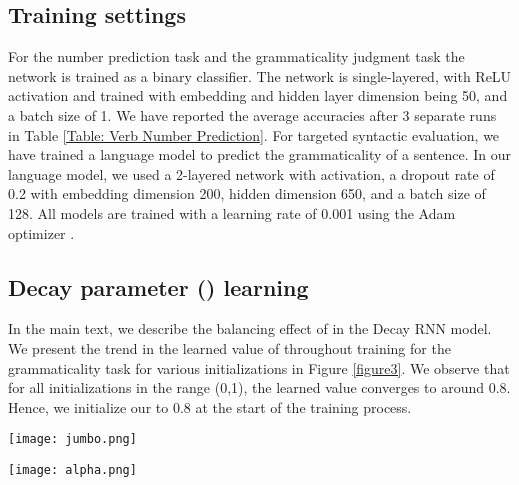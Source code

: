 \documentclass[11pt,a4paper]{article}
\begin{document}
\subsection{Training settings}
\label{subsec: training settings}
For the number prediction task and the grammaticality judgment task the network is trained as a binary classifier. The network is single-layered, with ReLU activation and trained with embedding and hidden layer dimension being 50, and a batch size of 1. We have reported the average accuracies after 3 separate runs in Table \ref{Table: Verb Number Prediction}. For targeted syntactic evaluation, we have trained a language model to predict the grammaticality of a sentence.  In our language model, we used a 2-layered network with  activation, a dropout rate of 0.2 with embedding dimension 200, hidden dimension 650, and a batch size of 128. All models are trained with a learning rate of 0.001 using the Adam optimizer \cite{kingma2014adam}. 

\subsection{Decay parameter () learning}

In the main text, we describe the balancing effect of  in the Decay RNN model. We present the trend in the learned value of  throughout training for the grammaticality task for various initializations in Figure \ref{figure3}. We observe that for all  initializations in the range (0,1), the learned value converges to around 0.8. Hence, we initialize our  to 0.8 at the start of the training process. 

\begin{figure*}
    \centering
    \texttt{[image: jumbo.png]}
    \caption{Performance of the LSTM (blue), DRNN (orange), and SDRNN (green) models for the different types of sentences in the generalization set, when trained for the grammaticality judgment task. There were at least 200 test sentences for each of these types.}
    \label{figure2}
\end{figure*}

\begin{figure*}
    \centering
    \texttt{[image: alpha.png]}
    \caption{Moving average of  over the course of training for different initializations. 1 unit of training length is 1 forward pass.}
    \label{figure3}
\end{figure*}
\end{document}
